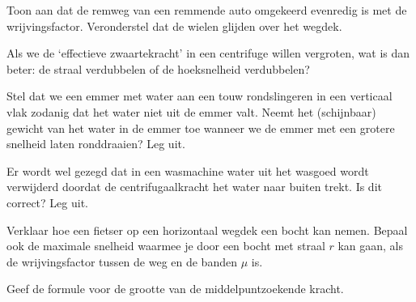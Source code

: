\begin{exercise} Toon aan dat de remweg van een remmende auto omgekeerd
evenredig is met de wrijvingsfactor. Veronderstel dat de wielen
glijden over het wegdek.

\end{exercise}

\begin{exercise} Als we de `effectieve zwaartekracht' in een centrifuge willen vergroten, wat is dan beter: de straal verdubbelen of de hoeksnelheid verdubbelen?

\end{exercise}

\begin{exercise} Stel dat we een emmer met water aan een touw rondslingeren in een verticaal vlak zodanig dat het water niet uit de emmer valt. Neemt het (schijnbaar) gewicht van het water in de emmer toe wanneer we de emmer met een grotere snelheid laten ronddraaien? Leg uit.

\end{exercise}

\begin{exercise} Er wordt wel gezegd dat in een wasmachine water uit het wasgoed wordt verwijderd doordat de centrifugaalkracht het water naar buiten trekt. Is dit correct? Leg uit.

\end{exercise}

\begin{exercise} Verklaar hoe een fietser op een horizontaal wegdek een bocht kan nemen. Bepaal ook de maximale snelheid waarmee je door een bocht met straal $r$ kan gaan, als de wrijvingsfactor tussen de weg en de banden $\mu$ is.

\end{exercise}

\begin{exercise} Geef de formule voor de grootte van de middelpuntzoekende kracht.

\end{exercise}


